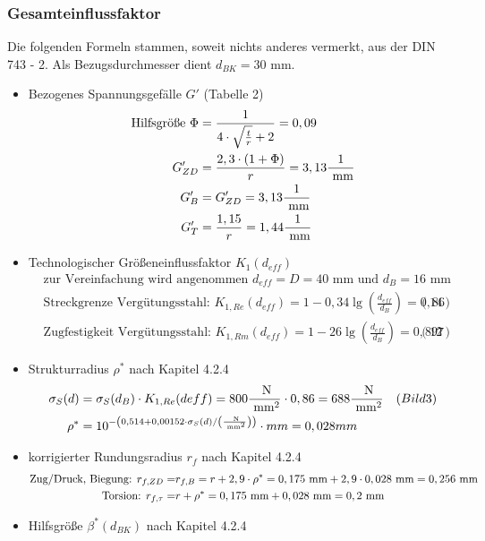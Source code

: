 \subsubsection{Gesamteinflussfaktor}
Die folgenden Formeln stammen, soweit nichts anderes vermerkt, aus der DIN 743 - 2. Als Bezugsdurchmesser dient $d_{BK} = 30$ mm.
\begin{itemize}
\item Bezogenes Spannungsgefälle $G'$ \hfill (Tabelle 2)
	\begin{align*}
	\text{Hilfsgröße } \Phi &= \frac{1}{4 \cdot \sqrt{\frac{t}{r}} +2} = 0,09 \\
	G'_{ZD} &= \frac{2,3 \cdot (1+\Phi)}{r} = 3,13 \frac{1}{\text{ mm}} \\
	G'_{B}&= G'_{ZD}  =3,13 \frac{1}{\text{ mm}} \\
	G'_{T}&= \frac{1,15}{r} = 1,44\frac{1}{\text{ mm}} 
	\end{align*}
\item Technologischer Größeneinflussfaktor $K_1 (d_{eff})$ 
	\begin{align*}
	&\text{zur Vereinfachung wird angenommen } d_{eff} = D =40 \text{ mm und } d_B = 16 \text{ mm} \\ 
	&\text{Streckgrenze Vergütungsstahl: }K_{1,Re}(d_{eff}) = 1 - 0,34 \lg \left( \frac{d_{eff}}{d_B} \right) = 0,86  &(14) \\
	&\text{Zugfestigkeit Vergütungsstahl: } K_{1,Rm}(d_{eff}) = 1 - 26 \lg \left( \frac{d_{eff}}{d_B} \right) = 0,897  &(12) 
	\end{align*}
\item Strukturradius $ \rho ^*$ nach Kapitel 4.2.4
	\begin{align*}
	\sigma_S (d) &= \sigma_S (d_B) \cdot K_{1,Re}(deff) = 800 \frac{\text{ N}}{\text{ mm}^2} \cdot 0,86 = 688 \frac{\text{ N}}{\text{ mm}^2} &(Bild 3)\\ 
	\rho ^* &=10 ^{-\left(0,514+0,00152\cdot \sigma_S (d) / \left(\frac{\text{ N}}{\text{ mm}^2} \right) \right)} \cdot mm= 0,028 mm
	\end{align*}
\item korrigierter Rundungsradius $ r_f$ nach Kapitel 4.2.4
	\begin{align*}
	\text{Zug/Druck, Biegung: } r_{f,ZD} =& r_{f,B} = r + 2,9 \cdot \rho ^* = 0,175 \text{ mm} + 2,9 \cdot 0,028 \text{ mm} = 0,256 \text{ mm}\\ 
	\text{Torsion: } r_{f,\tau} =& r +  \rho ^* = 0,175 \text{ mm} + 0,028 \text{ mm} = 0,2\text{ mm}
	\end{align*}
\item Hilfsgröße $ \beta^* (d_{BK})$ nach Kapitel 4.2.4

\end{itemize}
